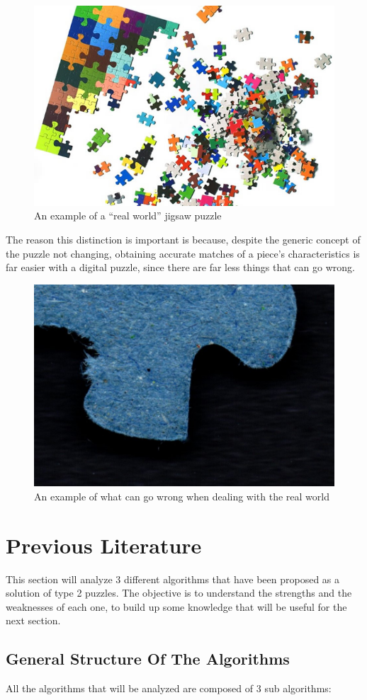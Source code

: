 \documentclass{article}
\begin{document}
\begin{figure}[h]
    \caption{An example of a “real world” jigsaw  puzzle}\label{fig:figure_real_puzzle}
    \includegraphics[height=0.25\textwidth]{pictures/real_puzzle.jpg}
    \centering

\end{figure}

The reason this distinction is important is because,
despite the generic concept of the puzzle not changing,
obtaining accurate matches of a piece's characteristics
is far easier with a digital puzzle,
since there are far less things that can go wrong.


\begin{figure}[h]
    \caption{An example of what can go wrong when dealing with the real world}\label{fig:figure_measurement_error}
    \includegraphics[height=0.25\textwidth]{pictures/example_bad_piece.jpg}
    \centering

\end{figure}

\section{Previous Literature}
This section will analyze 3 different algorithms that have been proposed
as a solution of type 2 puzzles. The objective is to understand the
strengths and the weaknesses of each one, to build up some knowledge
that will be useful for the next section.

\subsection{General Structure Of The Algorithms}

All the algorithms that will be analyzed are composed of 3 sub algorithms:
\end{document}
